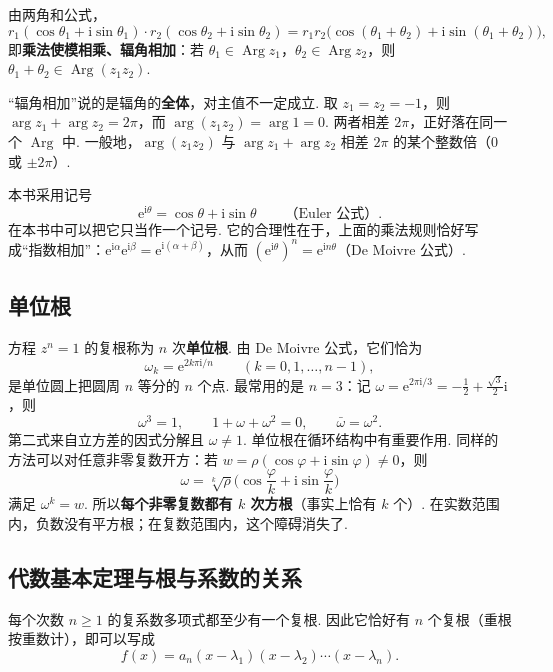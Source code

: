 由两角和公式，
\[r_1(\cos\theta_1+\mathrm i\sin\theta_1)\cdot r_2(\cos\theta_2+\mathrm i\sin\theta_2)=r_1r_2\big(\cos(\theta_1+\theta_2)+\mathrm i\sin(\theta_1+\theta_2)\big),\]
即\textbf{乘法使模相乘、辐角相加}：若 $\theta_1\in\operatorname{Arg}z_1$，$\theta_2\in\operatorname{Arg}z_2$，则 $\theta_1+\theta_2\in\operatorname{Arg}(z_1z_2)$.

\begin{pitfallbox}
	“辐角相加”说的是辐角的\textbf{全体}，对主值不一定成立. 取 $z_1=z_2=-1$，则 $\arg z_1+\arg z_2=2\pi$，而 $\arg(z_1z_2)=\arg1=0$. 两者相差 $2\pi$，正好落在同一个 $\operatorname{Arg}$ 中. 一般地，$\arg(z_1z_2)$ 与 $\arg z_1+\arg z_2$ 相差 $2\pi$ 的某个整数倍（$0$ 或 $\pm2\pi$）.
\end{pitfallbox}

本书采用记号
\[\mathrm e^{\mathrm i\theta}=\cos\theta+\mathrm i\sin\theta\qquad\text{（Euler 公式）}.\]
在本书中可以把它只当作一个记号. 它的合理性在于，上面的乘法规则恰好写成“指数相加”：$\mathrm e^{\mathrm i\alpha}\mathrm e^{\mathrm i\beta}=\mathrm e^{\mathrm i(\alpha+\beta)}$，从而 $(\mathrm e^{\mathrm i\theta})^n=\mathrm e^{\mathrm in\theta}$（De Moivre 公式）.

\subsection{单位根}

方程 $z^n=1$ 的复根称为 $n$ 次\textbf{单位根}. 由 De Moivre 公式，它们恰为
\[\omega_k=\mathrm e^{2k\pi\mathrm i/n}\qquad(k=0,1,\ldots,n-1),\]
是单位圆上把圆周 $n$ 等分的 $n$ 个点. 最常用的是 $n=3$：记 $\omega=\mathrm e^{2\pi\mathrm i/3}=-\frac12+\frac{\sqrt3}2\mathrm i$，则
\[\omega^3=1,\qquad 1+\omega+\omega^2=0,\qquad \bar\omega=\omega^2.\]
第二式来自立方差的因式分解且 $\omega\ne1$. 单位根在循环结构中有重要作用. 同样的方法可以对任意非零复数开方：若 $w=\rho(\cos\varphi+\mathrm i\sin\varphi)\ne0$，则
\[\omega=\sqrt[k]{\rho}\Big(\cos\frac\varphi k+\mathrm i\sin\frac\varphi k\Big)\]
满足 $\omega^k=w$. 所以\textbf{每个非零复数都有 $k$ 次方根}（事实上恰有 $k$ 个）. 在实数范围内，负数没有平方根；在复数范围内，这个障碍消失了.

\subsection{代数基本定理与根与系数的关系}

\begin{theorem}[代数基本定理]
	每个次数 $n\ge1$ 的复系数多项式都至少有一个复根. 因此它恰好有 $n$ 个复根（重根按重数计），即可以写成
	\[f(x)=a_n(x-\lambda_1)(x-\lambda_2)\cdots(x-\lambda_n).\]
\end{theorem}

